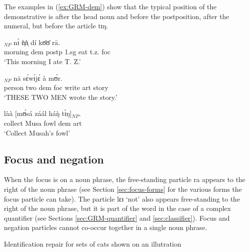 \begin{exe}
\begin{exe}
\begin{exe}
{\begin{exe}
\begin{exe}
\begin{exe}
\begin{exe}
\begin{exe}
\begin{exe}
\begin{exe}
\begin{exe}
\begin{exe}
\begin{exe}
\begin{exe}
\z



The examples in (\ref{ex:GRM-dem}) show that the typical position of  the
demonstrative is after the head noun and before the postposition, after the
numeral,  but before the article {\sls tɪŋ}. 


\ea\label{ex:GRM-dem} 
 
 
  \ea\label{ex:GRM-dem-n-postp} 
 \gll [tʃʊ̀ɔ̀sá háŋ̀]$_{NP}$ nɪ́ ǹ̩ǹ̩ dí kʊ̄ʊ̄ rā.\\
 morning {\sc dem} {\sc postp} {\sc 1.sg} eat t.z. {\sc foc}\\
 \glt  `This morning I ate T. Z.'

   \ex\label{ex:GRM-dem-num} 
 \gll [nárá bálɪ̀ɛ̀ háŋ̀]$_{NP}$ nā sɛ́wɪ́jɛ́ à mʊ́r.\\
person two {\sc dem}  {\sc foc} write {\sc art} story\\
\glt `THESE TWO MEN wrote the story.' 

   \ex\label{ex:GRM-dem-art}
 \gll làà [mʊ́sá záál háŋ̀ tɪ̀ŋ]$_{NP}$.\\
 collect Musa fowl  {\sc dem} {\sc art}\\
 \glt `Collect  Musah's  fowl'  


 
\z 
 \z




\subsection{Focus and negation}
\label{sec:GRM-foc-neg}

When the focus is on a noun phrase, the free-standing particle {\sls ra} appears
to the right of the noun phrase (see Section \ref{sec:focus-forms} for the
various forms the focus particle can take). The   particle {\sls lɛɪ} `not' also  appears 
free-standing
to the right of the noun phrase, but it is part of the word in the case of a complex quantifier
(see Sections \ref{sec:GRM-quantifier}  and  \ref{sec:classifier}). Focus and
negation particles cannot co-occur together in a single noun phrase.  

\begin{exe}
 \ex\label{ex:GRM-foc-neg}{\rm Identification repair for sets of cats shown on an illutration}\\
 

\end{exe}
\end{exe}
\end{exe}
\end{exe}
\end{exe}
\end{exe}
\end{exe}
\end{exe}
\end{exe}
\end{exe}
\end{exe}
\end{exe}}
\end{exe}
\end{exe}
\end{exe}
